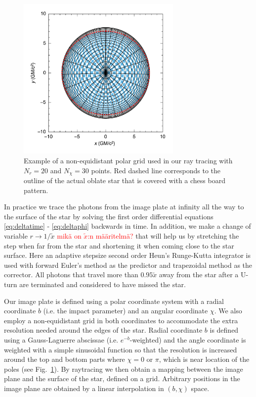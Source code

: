 \documentclass[iop, usenatbib]{emulateapj}
\newcommand{\red}[1]{\textcolor{red}{#1}}
\begin{document}
\begin{figure}
\centering
\includegraphics[width=8cm]{figs/fig6a.pdf}
\caption{\label{fig:grid}
Example of a non-equidistant polar grid used in our ray tracing with $N_r = 20$ and $N_{\chi} = 30$ points.
Red dashed line corresponds to the outline of the actual oblate star that is covered with a chess board pattern.
}
\end{figure}

In practice we trace the photons from the image plate at infinity all
the way to the surface of the star by solving the first order
differential equations \eqref{eq:deltatime} - \eqref{eq:deltaphi}
backwards in time.  In addition, we make a change of variable $r
\rightarrow 1/\tilde{x}$ \red{mikä on $\tilde{x}$:n määritelmä?} that will help us by stretching the step when
far from the star and shortening it when coming close to the star
surface.  Here an adaptive stepsize second order Heun's Runge-Kutta
integrator is used with forward Euler's method as
the predictor and trapezoidal method as the corrector.  
All photons that travel
more than $0.95\tilde{x}$ away from the star after a U-turn are
terminated and considered to have missed the star.

Our image plate is defined using a polar coordinate system with a radial
coordinate $b$ (i.e. the impact parameter) and an angular coordinate $\chi$.
We also employ a non-equidistant grid in both coordinates to accommodate
the extra resolution needed around the edges of the star.  Radial
coordinate $b$ is defined using a Gauss-Laguerre abscissae (i.e.
$e^{-b}$-weighted) and the angle coordinate is weighted with a simple
sinusoidal function so that the resolution is increased around the top
and bottom parts where $\chi = 0$ or $\pi$, which is near location of the poles
(see Fig.~\ref{fig:grid}).  By raytracing we then obtain
a mapping between the image plane and the surface of the star, defined
on a grid.
Arbitrary positions in the image plane are 
obtained by a linear interpolation in $(b, \chi)$ space.
\end{document}
